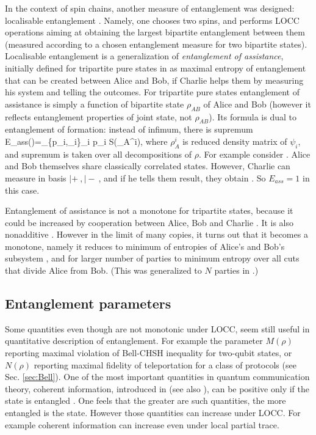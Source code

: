 \documentclass[rmp,12pt,preprint]{revtex4-2}
\begin{document}
In the context of spin chains, another measure of entanglement was
designed: localisable entanglement \cite{VerstraetePC2003-locent}. Namely,
one chooses two spins,
and  performs LOCC operations aiming at obtaining the largest
bipartite entanglement between them (measured according to a chosen
entanglement measure for two bipartite states). Localisable
entanglement is a generalization of {\it entanglement of
assistance}, initially defined for tripartite pure states in
\cite{entass} as maximal entropy of entanglement that can be created
between Alice and Bob, if Charlie helps them by measuring his system
and telling the outcomes. For tripartite pure states entanglement of
assistance is simply a function of bipartite state $\rho_{AB}$ of
Alice and Bob (however it reflects entanglement properties of joint
state, not $\rho_{AB}$). Its formula is dual to entanglement of
formation: instead of infimum, there is supremum \be
E_{ass}(\rho)=\sup_{\{p_i,\psi_i\}}\sum_i p_i S(\rho_A^i), \ee where
$\rho_A^i$ is reduced density matrix of $\psi_i$, and supremum is
taken over all decompositions of $\rho$. For example consider \ghzstate.
Alice and Bob themselves share classically correlated states.
However, Charlie can measure in basis $|+\>,|-\>$, and if he tells
them result, they obtain \eprpair. So $E_{ass}= 1$ in this case.

Entanglement of assistance is not a monotone for tripartite states,
because it could be increased by cooperation between Alice, Bob and
Charlie \cite{GourS2005-eass}. It is also nonadditive \cite{entass}.
However in the limit of many copies, it turns out that it becomes a
monotone, namely it reduces to minimum of entropies of Alice's and
Bob's subsystem \cite{svw2005}, and for larger number of parties to
minimum entropy over all cuts that divide Alice from Bob. (This was
generalized to $N$ parties in \cite{SW-nature,sw-long}.)





\subsection{Entanglement parameters}

Some quantities even though are not monotonic under LOCC, seem still
useful in quantitative description of entanglement. For example the
parameter $M(\rho)$ \cite{HHH1995-bell} reporting maximal violation of
Bell-CHSH inequality for two-qubit states, or $N(\rho)$ reporting
maximal fidelity of teleportation for a class of protocols
\cite{HHH1996-teleportation} (see Sec. \ref{sec:Bell}). One of the
most important quantities in quantum communication theory, coherent
information, introduced in \cite{SchumacherN-1996-pra} (see also
\cite{Lloyd-cap}), can be positive only if the state is entangled
\cite{RPH1994}. One feels that the greater are such quantities, the
more entangled is the state. However those quantities can increase
under LOCC. For example coherent information can increase even under
local partial trace.
\end{document}

